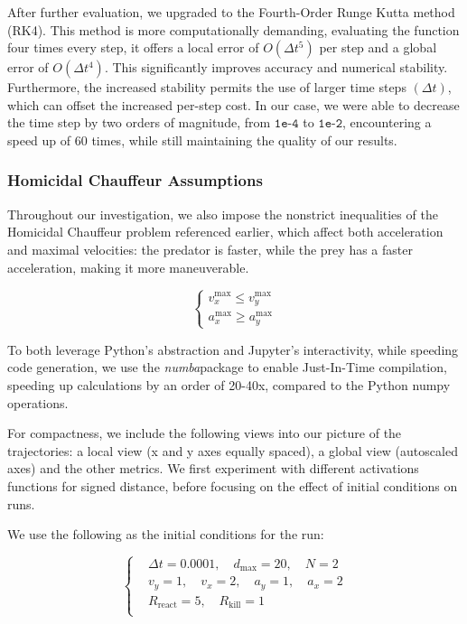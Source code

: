 \documentclass[10pt, twocolumn]{article}
\begin{document}
    After further evaluation, we upgraded to the Fourth-Order Runge Kutta method (RK4). This method is more computationally demanding, evaluating the function four times every step, it offers a local error of $O(\Delta t^5)$ per step and a global error of $O(\Delta t^4)$. This significantly improves accuracy and numerical stability. Furthermore, the increased stability permits the use of larger time steps $(\Delta t)$, which can offset the increased per-step cost. In our case, we were able to decrease the time step by two orders of magnitude, from $\texttt{1e-4}$ to $\texttt{1e-2}$, encountering a speed up of 60 times, while still maintaining the quality of our results.

    \subsubsection{Homicidal Chauffeur Assumptions}
    Throughout our investigation, we also impose the nonstrict inequalities of the Homicidal Chauffeur problem referenced earlier, which affect both acceleration and maximal velocities: the predator is faster, while the prey has a faster acceleration, making it more maneuverable.

    \[
      \left\{
        \begin{aligned}
          v^{\text{max}}_x \leq v^{\text{max}}_y \\
          a^{\text{max}}_x \geq a^{\text{max}}_y
        \end{aligned}
        \right.
      \]

      To both leverage Python's abstraction and Jupyter's interactivity, while speeding code generation, we use the \textit{numba}package to enable Just-In-Time compilation, speeding up calculations by an order of 20-40x, compared to the Python numpy operations.

      For compactness, we include the following views into our picture of the trajectories: a local view (x and y axes equally spaced), a global view (autoscaled axes) and the other metrics. We first experiment with different activations functions for signed distance, before focusing on the effect of initial conditions on runs.

      We use the following as the initial conditions for the run:

      \[
        \left\{
          \begin{aligned}
            &\Delta t = 0.0001,\quad d_{\text{max}} = 20,\quad N = 2 \\
            &v_y = 1, \quad v_x = 2, \quad a_y = 1, \quad a_x = 2 \\
            &R_{\text{react}} = 5,\quad R_{\text{kill}} = 1 \\
          \end{aligned}
          \right.
        \]
\end{document}
